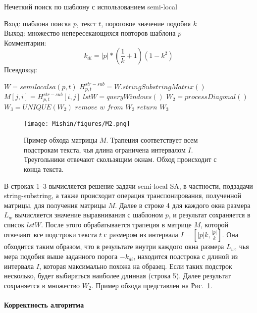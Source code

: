 \begin{algorithm}[t!]
\caption{Нечеткий поиск по шаблону с использованием semi-local}\label{alg:patternMathing1}
Вход: шаблона поиска $p$, текст $t$, пороговое значение подобия $k$\\
Выход: множество непересекающихся повторов шаблона $p$\\
Комментарии:
\begin{equation}
    k_{di}=|p|*(\frac{1}{k}+1)(1-k^2)
\end{equation}
Псевдокод:
\begin{algorithmic}[1]
\State $W = semilocalsa(p,t)$
\State $ H^{str-sub}_{p,t} =  W.stringSubstringMatrix()$
\State $ M[j,i] = H^{str-sub}_{p,t}[i,j] $
\State $lstW = queryWindows()$
\State $W_2 = processDiagonal()$
\State $W_3 = UNIQUE(W_2)$
\State $remove$ $w$ $from$ $W_3$
\EndIf
\EndFor
\State $return$ $W_3$

\end{algorithmic}
\end{algorithm}

\begin{figure}[t!]
\centering
    \texttt{[image: Mishin/figures/M2.png]}
    \caption{Пример обхода матрицы $M$. Трапеция соответствует всем подстрокам текста, чья длина ограничена интервалом $I$. Треугольники отвечают скользящим окнам.
    Обход происходит с конца текста.
    }\label{passage}
\end{figure}

В строках 1--3 вычисляется решение задачи semi-local SA, в частности, подзадачи string-substring, а также происходит операция транспонирования, полученной матрицы, для получения матрицы $M$.
Далее в строке 4 для каждого окна размера $L_{w}$ вычисляется значение выравнивания с шаблоном $p$, и результат сохраняется в список $lstW$.
После этого обрабатывается трапеция в матрице $M$, которой отвечают все подстроки текста $t$ с размером из интервала $I=[|p|k,\frac{|p|}{k}]$.
Она обходится таким образом, что в результате внутри каждого окна размера $L_{w}$, чья  мера подобия выше заданного порога $-k_{di}$, находится подстрока с длиной из интервала $I$, которая максимально похожа на образец.
Если таких подстрок несколько, будет выбираться наиболее длинная (строка 5).
Далее результат сохраняется в множество $W_{2}$.
Пример обхода представлен на Рис.~\ref{passage}.

\paragraph*{Корректность алгоритма}\mbox{}

